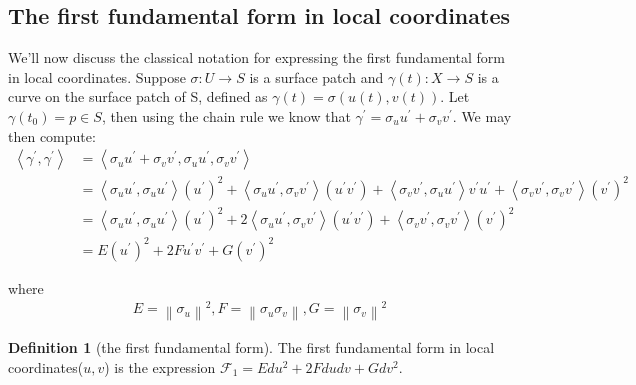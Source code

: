 \documentclass{article}
\theoremstyle{plain}
\theoremstyle{definition}
\newtheorem{definition}{Definition}
\theoremstyle{remark}
\begin{document}
\subsection{The first fundamental form in local coordinates}
We'll now discuss the classical notation for expressing the first fundamental form in local coordinates. Suppose \( \sigma: U \rightarrow S\) is a surface patch and \(\gamma(t): X \rightarrow S\) is a curve on the surface patch of S, defined as \( \gamma(t) = \sigma(u(t),v(t))\). Let \( \gamma(t_0) = p \in S \), then using the chain rule we know that \( \gamma^\prime = \sigma_u u^\prime +  \sigma_v v^\prime\).
We may then compute:
\begin{align}
    \left\langle \gamma^\prime, \gamma^\prime\right\rangle
     & = \left\langle \sigma_u u^\prime +  \sigma_v v^\prime ,  \sigma_u u^\prime,  \sigma_v v^\prime\right\rangle \nonumber                                                                                                                                                                                                                         \\
     & = \left\langle \sigma_u u^\prime, \sigma_u u^\prime\right\rangle (u^\prime)^2 + \left\langle \sigma_u u^\prime, \sigma_v v^\prime\right\rangle (u^\prime v^\prime) + \left\langle \sigma_v v^\prime, \sigma_u u^\prime\right\rangle v^\prime u^\prime + \left\langle \sigma_v v^\prime, \sigma_v v^\prime\right\rangle (v^\prime)^2 \nonumber \\
     & = \left\langle \sigma_u u^\prime, \sigma_u u^\prime\right\rangle (u^\prime)^2 + 2\left\langle \sigma_u u^\prime, \sigma_v v^\prime\right\rangle (u^\prime v^\prime) + \left\langle \sigma_v v^\prime, \sigma_v v^\prime\right\rangle (v^\prime)^2 \nonumber                                                                                   \\
     & = E(u^\prime)^2 + 2F u^\prime v^\prime + G (v^\prime)^2
\end{align}

where
\begin{align}
    E = \left\lVert \sigma_u \right\rVert ^2, F = \left\lVert \sigma_u \sigma_v\right\rVert ,  G = \left\lVert
    \sigma_v \right\rVert ^2
\end{align}

\begin{definition}[the first fundamental form]
    The first fundamental form in local coordinates(\(u,v\)) is the expression \(\mathcal{F}_1 =  E du^2 + 2F du dv + G dv^2 \).
\end{definition}
\end{document}
